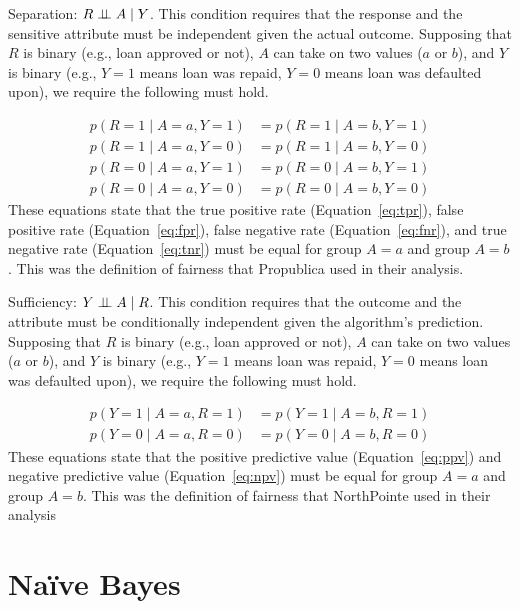 \documentclass{tufte-handout}
\begin{document}
\item Separation: $R \perp\!\!\!\perp A \mid Y$.  This condition requires that the response and the sensitive attribute must be independent given the actual outcome.  Supposing that $R$ is binary (e.g., loan approved or not), $A$ can take on two values ($a$ or $b$), and $Y$ is binary (e.g., $Y=1$ means loan was repaid, $Y=0$ means loan was defaulted upon), we require the following must hold.

\begin{align}
p(R=1 \mid A=a, Y=1) &= p(R=1 \mid A=b, Y=1) \label{eq:tpr} \\
p(R=1 \mid A=a, Y=0) &= p(R=1 \mid A=b, Y=0) \label{eq:fpr} \\
p(R=0 \mid A=a, Y=1) &= p(R=0 \mid A=b, Y=1) \label{eq:fnr} \\
p(R=0 \mid A=a, Y=0) &= p(R=0 \mid A=b, Y=0) \label{eq:tnr}
\end{align}
These equations state that the true positive rate (Equation~\ref{eq:tpr}), false positive rate (Equation~\ref{eq:fpr}), false negative rate (Equation~\ref{eq:fnr}), and true negative rate (Equation~\ref{eq:tnr}) must be equal for group $A=a$ and group $A=b$.  This was the definition of fairness that Propublica used in their analysis.

\item Sufficiency: $Y \perp\!\!\!\perp A\mid R$.  This condition requires that the outcome and the attribute must be conditionally independent given the algorithm's prediction.   Supposing that $R$ is binary (e.g., loan approved or not), $A$ can take on two values ($a$ or $b$), and $Y$ is binary (e.g., $Y=1$ means loan was repaid, $Y=0$ means loan was defaulted upon), we require the following must hold.

\begin{align}
p(Y=1 \mid A=a, R=1) &= p(Y=1 \mid A=b, R=1) \label{eq:ppv} \\
p(Y=0 \mid A=a, R=0) &= p(Y=0 \mid A=b, R=0) \label{eq:npv}
\end{align}
These equations state that the positive predictive value (Equation~\ref{eq:ppv}) and negative predictive value (Equation~\ref{eq:npv}) must be equal for group $A=a$ and group $A=b$.  This was the definition of fairness that NorthPointe used in their analysis
\ei

\section{Na\"ive Bayes}
\end{document}
